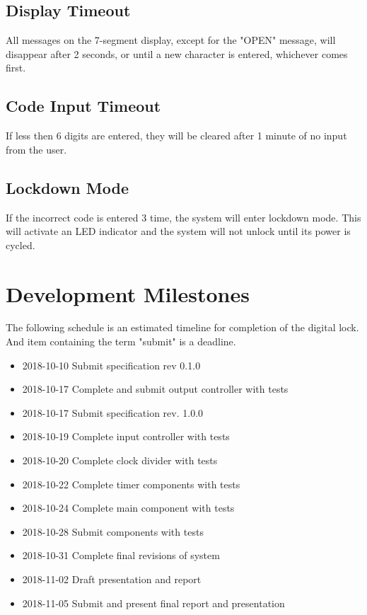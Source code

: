 \documentclass[11pt]{article}
\begin{document}
\subsection{Display Timeout}

All messages on the 7-segment display, except for the "OPEN" message, will disappear after 2 seconds, or until a new character is entered, whichever comes first.

\subsection{Code Input Timeout}

If less then 6 digits are entered, they will be cleared after 1 minute of no input from the user.

\subsection{Lockdown Mode}

If the incorrect code is entered 3 time, the system will enter lockdown mode. This will activate an LED indicator and the system will not unlock until its power is cycled.

\section{Development Milestones}

The following schedule is an estimated timeline for completion of the digital lock. And item containing the term "submit" is a deadline.

\begin{itemize}
	\item 2018-10-10 Submit specification rev 0.1.0
	\item 2018-10-17 Complete and submit output controller with tests
	\item 2018-10-17 Submit specification rev. 1.0.0
	\item 2018-10-19 Complete input controller with tests
	\item 2018-10-20 Complete clock divider with tests
	\item 2018-10-22 Complete timer components with tests
	\item 2018-10-24 Complete main component with tests
	\item 2018-10-28 Submit components with tests
	\item 2018-10-31 Complete final revisions of system
	\item 2018-11-02 Draft presentation and report
	\item 2018-11-05 Submit and present final report and presentation
\end{itemize}
\end{document}
